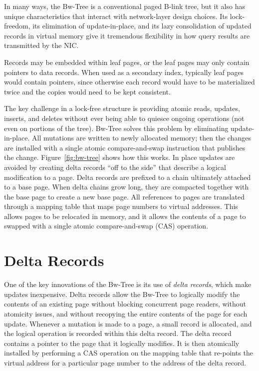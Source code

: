 In many ways, the Bw-Tree is a conventional paged B-link tree,
but it also has unique characteristics that interact with network-layer
design choices. Its lock-freedom, its elimination of update-in-place,
and its lazy consolidation of updated records in virtual memory give it
tremendous flexibility in how query results are transmitted by the NIC.

Records may be embedded within leaf pages, or the leaf pages may
only contain pointers to data records. When used as a secondary index,
typically leaf pages would contain pointers, since otherwise each record would
have to be materialized twice and the copies would need to be kept consistent.

The key challenge in a lock-free structure is providing atomic reads, updates,
inserts, and deletes without ever being able to quiesce ongoing operations (not
even on portions of the tree). Bw-Tree solves this problem by eliminating
update-in-place. All mutations are written to newly allocated memory; then
the changes are installed with a single atomic compare-and-swap instruction
that publishes the change.  Figure~\ref{fig:bw-tree} shows how this works.
In place updates are avoided by creating delta records ``off to the side'' 
that describe a logical modification to a page. Delta records are
prefixed to a chain ultimately attached to a base page.  When delta chains
grow long, they are compacted together with the base page to create a new base page.
All references to pages are translated through a mapping table that maps page
numbers to virtual addresses. This allows pages to be relocated in memory, and
it allows the contents of a page to swapped with a single atomic
compare-and-swap (CAS) operation.



\section{Delta Records}
\label{sec:deltarecords}
One of the key innovations of the Bw-Tree is its use of {\em delta records},
which make updates inexpensive.
Delta records allow the Bw-Tree to logically modify the
contents of an existing page without blocking concurrent page readers, without
atomicity issues, and without recopying the entire contents of the page for
each update.  Whenever a mutation is made to a page, a small record is
allocated, and the logical operation is recorded within this delta record. The delta
record contains a pointer to the page that it logically modifies. It
is then atomically installed by performing a CAS operation on the
mapping table that re-points the virtual address for a particular page number
to the address of the delta record.

